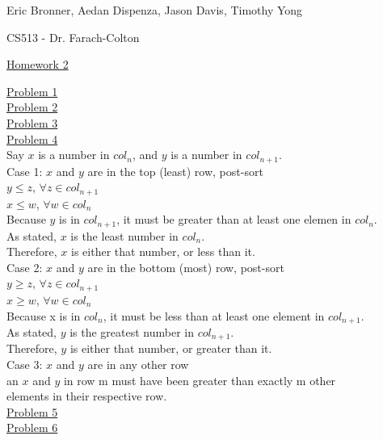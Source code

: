 \documentclass[12pt]{article}
\begin{document}
\pagestyle{headings}
\centerline{Eric Bronner, Aedan Dispenza, Jason Davis, Timothy Yong}
\centerline{CS513 - Dr. Farach-Colton}
\centerline{\underline{Homework 2}}
\noindent \underline{Problem 1}\\
\underline{Problem 2}\\
\underline{Problem 3}\\
\underline{Problem 4}\\
Say $x$ is a number in $col_n$, and $y$ is a number in $col_{n+1}$.\\
Case 1: $x$ and $y$ are in the top (least) row, post-sort\\
\indent $y \leq z$, $\forall z \in col_{n+1}$\\
\indent $x \leq w$, $\forall w \in col_{n}$\\
\indent Because $y$ is in $col_{n+1}$, it must be greater than at least one elemen in $col_n$.\\
\indent As stated, $x$ is the least number in $col_n$.\\
\indent Therefore, $x$ is either that number, or less than it.\\
Case 2: $x$ and $y$ are in the bottom (most) row, post-sort\\
\indent $y \geq z$, $\forall z \in col_{n+1}$\\
\indent $x \geq w$, $\forall w \in col_{n}$\\
\indent Because x is in $col_n$, it must be less than at least one element in $col_{n+1}$.\\
\indent As stated, $y$ is the greatest number in $col_{n+1}$.\\
\indent Therefore, $y$ is either that number, or greater than it.\\
Case 3: $x$ and $y$ are in any other row\\
\indent an $x$ and $y$ in row m must have been greater than exactly m other\\
\indent \indent elements in their respective row.\\
\underline{Problem 5}\\
\underline{Problem 6}\\
\end{document}
